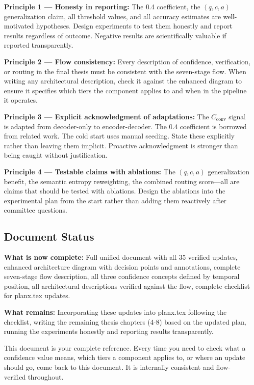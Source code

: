 \documentclass[11pt,a4paper]{article}
\newcommand{\Cconv}{C_{\text{conv}}}
\begin{document}
\textbf{Principle 1 — Honesty in reporting:} The 0.4 coefficient, the $(q,c,a)$ generalization claim, all threshold values, and all accuracy estimates are well-motivated hypotheses. Design experiments to test them honestly and report results regardless of outcome. Negative results are scientifically valuable if reported transparently.

\textbf{Principle 2 — Flow consistency:} Every description of confidence, verification, or routing in the final thesis must be consistent with the seven-stage flow. When writing any architectural description, check it against the enhanced diagram to ensure it specifies which tiers the component applies to and when in the pipeline it operates.

\textbf{Principle 3 — Explicit acknowledgment of adaptations:} The $\Cconv$ signal is adapted from decoder-only to encoder-decoder. The 0.4 coefficient is borrowed from related work. The cold start uses manual seeding. State these explicitly rather than leaving them implicit. Proactive acknowledgment is stronger than being caught without justification.

\textbf{Principle 4 — Testable claims with ablations:} The $(q,c,a)$ generalization benefit, the semantic entropy reweighting, the combined routing score—all are claims that should be tested with ablations. Design the ablations into the experimental plan from the start rather than adding them reactively after committee questions.

\subsection{Document Status}

\textbf{What is now complete:} Full unified document with all 35 verified updates, enhanced architecture diagram with decision points and annotations, complete seven-stage flow description, all three confidence concepts defined by temporal position, all architectural descriptions verified against the flow, complete checklist for planx.tex updates.

\textbf{What remains:} Incorporating these updates into planx.tex following the checklist, writing the remaining thesis chapters (4-8) based on the updated plan, running the experiments honestly and reporting results transparently.

This document is your complete reference. Every time you need to check what a confidence value means, which tiers a component applies to, or where an update should go, come back to this document. It is internally consistent and flow-verified throughout.
\end{document}
